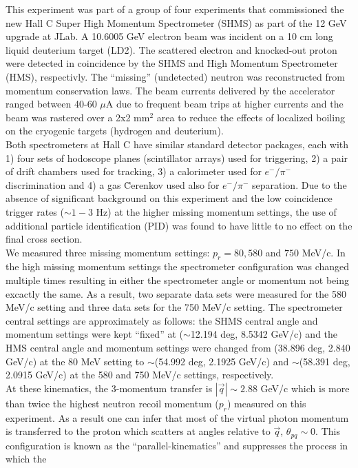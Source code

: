 \indent This experiment was part of a group of four experiments that commissioned the new Hall C Super High Momentum Spectrometer (SHMS) as part of the 12 GeV upgrade at JLab.
A 10.6005 GeV electron beam was incident on a 10 cm long liquid deuterium target (LD2). The scattered electron and knocked-out proton were detected in coincidence
by the SHMS and High Momentum Spectrometer (HMS), respectivly. The ``missing'' (undetected) neutron was reconstructed from momentum conservation laws.
The beam currents delivered by the accelerator ranged between 40-60 $\mu$A due to frequent beam trips at higher currents and the beam was rastered over a 2x2 mm$^{2}$ area to reduce
the effects of localized boiling on the cryogenic targets (hydrogen and deuterium). \\
\indent Both spectrometers at Hall C have similar standard detector packages, each with 1) four sets of hodoscope planes\cite{hodo_techreport} (scintillator arrays) used for triggering,
2) a pair of drift chambers\cite{dc_techreport} used for tracking, 3) a calorimeter\cite{Mkrtchyan_2013} used for $e^{-}/\pi^{-}$ discrimination and 4) a gas \u{C}erenkov \cite{Li_Wenliang_mthesis,ngc_techreport} used also for $e^{-}/\pi^{-}$ separation.
Due to the absence of significant background on this experiment and the low coincidence trigger rates
($\sim 1-3$ Hz) at the higher missing momentum settings, the use of additional particle identification (PID) was found to have little to no effect on the final cross section. \\
\indent We measured three missing momentum settings: $p_{r}=80,580$ and $750$ MeV/c. In the high missing momentum settings the spectrometer configuration was changed
multiple times resulting in either the spectrometer angle or momentum not being excactly the same. As a result, two separate data sets were measured for the 580 MeV/c setting and three data sets for the 750 MeV/c setting.  
The spectrometer central settings are approximately as follows: the SHMS central angle and momentum settings were kept ``fixed'' at ($\sim$12.194 deg, 8.5342 GeV/c) and the HMS central angle and momentum settings were changed from
(38.896 deg, 2.840 GeV/c) at the 80 MeV setting to $\sim$(54.992 deg, 2.1925 GeV/c) and $\sim$(58.391 deg, 2.0915 GeV/c) at the 580 and 750 MeV/c settings, respectively. \\
\indent At these kinematics, the 3-momentum transfer is $|\vec{q}| \sim 2.88$ GeV/c which is more than twice the highest neutron recoil momentum ($p_{r}$) measured on this experiment. As a result
one can infer that most of the virtual photon momentum is transferred to the proton which scatters at angles relative to $\vec{q}$, $\theta_{pq}\sim 0$. This configuration is known as the ``parallel-kinematics'' and suppresses the process in which the
